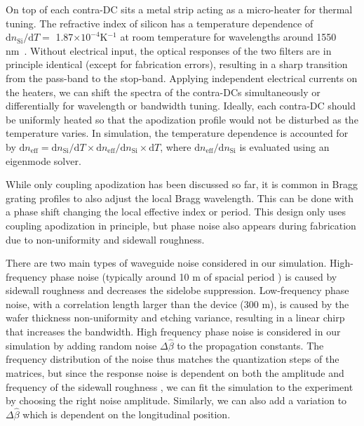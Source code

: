 \documentclass[9pt,twocolumn,twoside]{osajnl}
\begin{document}
On top of each contra-DC sits a metal strip acting as a micro-heater for thermal tuning.  
The refractive index of silicon has a temperature dependence of 
${\mathrm{d}{n_\text{Si}}}/{\mathrm{d}T}=$ 1.87$\times10^{-4}$K$^{-1}$
at room temperature for wavelengths around 1550 nm~\cite{frey2006temperature}.
Without electrical input, the optical responses of the two filters are in principle identical (except for fabrication errors), resulting in a sharp transition from the pass-band to the stop-band. 
Applying independent electrical currents on the heaters, we can shift the spectra of the contra-DCs simultaneously or differentially for wavelength or bandwidth tuning.
Ideally, each contra-DC should be uniformly heated so that the apodization profile would not be disturbed as the temperature varies.
In simulation, the temperature dependence is accounted for by 
$\mathrm{d}n_\text{eff}=\mathrm{d}n_\text{Si}/{\mathrm{d}T}\times\mathrm{d}n_\text{eff}/{\mathrm{d}n_\text{Si}}\times\mathrm{d}T$, where $\mathrm{d}n_\text{eff}/{\mathrm{d}n_\text{Si}}$ is evaluated using an eigenmode solver.

While only coupling apodization has been discussed so far, it is common in Bragg grating profiles to also adjust the local Bragg wavelength. This can be done with a phase shift changing the local effective index or period. This design only uses coupling apodization in principle, but phase noise also appears during fabrication due to non-uniformity and sidewall roughness.

There are two main types of waveguide noise considered in our simulation. High-frequency phase noise (typically around 10 \textmu m of spacial period \cite{simard2013characterization}) is caused by sidewall roughness and decreases the sidelobe suppression. Low-frequency phase noise, with a correlation length larger than the device (300 \textmu m), is caused by the wafer thickness non-uniformity and etching variance, resulting in a linear chirp that increases the bandwidth.
High frequency phase noise is considered in our simulation by adding random noise $\Delta\hat{\beta}$ to the propagation constants. The frequency distribution of the noise thus matches the quantization steps of the matrices, but since the response noise is dependent on both the amplitude and frequency of the sidewall roughness \cite{simard2011impact}, we can fit the simulation to the experiment by choosing the right noise amplitude.
Similarly, we can also add a variation to $\Delta\hat{\beta}$ which is dependent on the longitudinal position.
\end{document}
